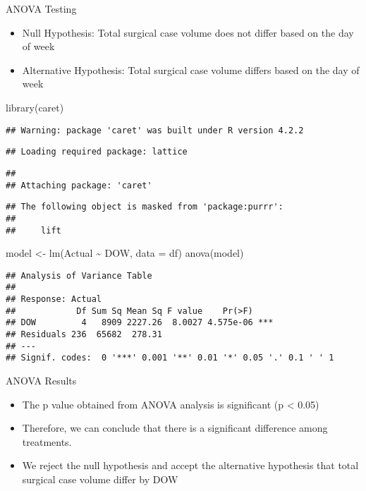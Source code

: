 \documentclass[
  ignorenonframetext,
]{beamer}
\newenvironment{Shaded}{\begin{snugshade}}{\end{snugshade}}
\newcommand{\AttributeTok}[1]{\textcolor[rgb]{0.77,0.63,0.00}{#1}}
\newcommand{\FunctionTok}[1]{\textcolor[rgb]{0.00,0.00,0.00}{#1}}
\newcommand{\NormalTok}[1]{#1}
\newcommand{\OtherTok}[1]{\textcolor[rgb]{0.56,0.35,0.01}{#1}}
\newcommand{\SpecialCharTok}[1]{\textcolor[rgb]{0.00,0.00,0.00}{#1}}
\providecommand{\tightlist}{%
  \setlength{\itemsep}{0pt}\setlength{\parskip}{0pt}}
\begin{document}
\begin{frame}[fragile]{ANOVA Testing}
\protect\hypertarget{anova-testing}{}
\begin{itemize}
\tightlist
\item
  Null Hypothesis: Total surgical case volume does not differ based on
  the day of week
\item
  Alternative Hypothesis: Total surgical case volume differs based on
  the day of week
\end{itemize}

\begin{Shaded}
\begin{Highlighting}[]
\FunctionTok{library}\NormalTok{(caret)}
\end{Highlighting}
\end{Shaded}

\begin{verbatim}
## Warning: package 'caret' was built under R version 4.2.2
\end{verbatim}

\begin{verbatim}
## Loading required package: lattice
\end{verbatim}

\begin{verbatim}
## 
## Attaching package: 'caret'
\end{verbatim}

\begin{verbatim}
## The following object is masked from 'package:purrr':
## 
##     lift
\end{verbatim}

\begin{Shaded}
\begin{Highlighting}[]
\NormalTok{model }\OtherTok{\textless{}{-}} \FunctionTok{lm}\NormalTok{(Actual }\SpecialCharTok{\textasciitilde{}}\NormalTok{ DOW, }\AttributeTok{data =}\NormalTok{ df)}
\FunctionTok{anova}\NormalTok{(model)}
\end{Highlighting}
\end{Shaded}

\begin{verbatim}
## Analysis of Variance Table
## 
## Response: Actual
##            Df Sum Sq Mean Sq F value    Pr(>F)    
## DOW         4   8909 2227.26  8.0027 4.575e-06 ***
## Residuals 236  65682  278.31                      
## ---
## Signif. codes:  0 '***' 0.001 '**' 0.01 '*' 0.05 '.' 0.1 ' ' 1
\end{verbatim}

\begin{block}{ANOVA Results}
\protect\hypertarget{anova-results}{}
\begin{itemize}
\item
  The p value obtained from ANOVA analysis is significant (p \textless{}
  0.05)
\item
  Therefore, we can conclude that there is a significant difference
  among treatments.
\item
  We reject the null hypothesis and accept the alternative hypothesis
  that total surgical case volume differ by DOW
\end{itemize}
\end{block}


\end{frame}
\end{document}

